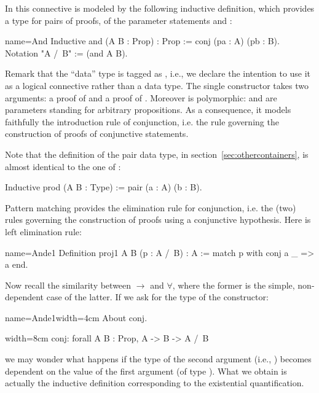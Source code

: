 In \Coq{} this connective is modeled by the following inductive
definition, which provides a type for pairs of proofs, of the
parameter statements  and :

\begin{coq}{name=And}{}
Inductive and (A B : Prop) : Prop := conj (pa : A) (pb : B).
Notation "A /\ B" := (and A B).
\end{coq}

Remark that the ``data'' type  is tagged as , i.e.,  we declare
the intention to use it as a logical connective rather than a data type.  The
single constructor  takes two
arguments: a proof of  and a proof of .
Moreover  is polymorphic:
 and  are parameters standing for arbitrary propositions.
As a consequence, it models faithfully the introduction rule of
conjunction, i.e. the rule governing the construction of proofs of
conjunctive statements.

Note that the definition of the pair data type,
in section~\ref{sec:othercontainers}, is almost identical to the one
of :

\begin{coq}{}{}
Inductive prod (A B : Type) := pair (a : A) (b : B).
\end{coq}

Pattern matching provides the elimination rule for
conjunction, i.e. the (two) rules governing the construction of proofs
using a conjunctive hypothesis. Here is left elimination rule:

\begin{coq}{name=Ande1}{}
Definition proj1 A B (p : A /\ B) : A :=
  match p with conj a _ => a end.
\end{coq}

Now recall the similarity between $\to$ and $\forall$, where the former is the
simple, non-dependent case of the latter.  If we ask for the type of
the  constructor:

\begin{coq-left}{name=Ande1}{width=4cm}
About conj.
\end{coq-left}
\begin{coqout-right}{}{width=8cm}
conj: forall A B : Prop, A -> B -> A /\ B
\end{coqout-right}

we may wonder what happens if the type of the second argument (i.e., )
becomes dependent on the value of the first argument (of type ).
What we obtain is actually the inductive definition corresponding to the
existential quantification.

